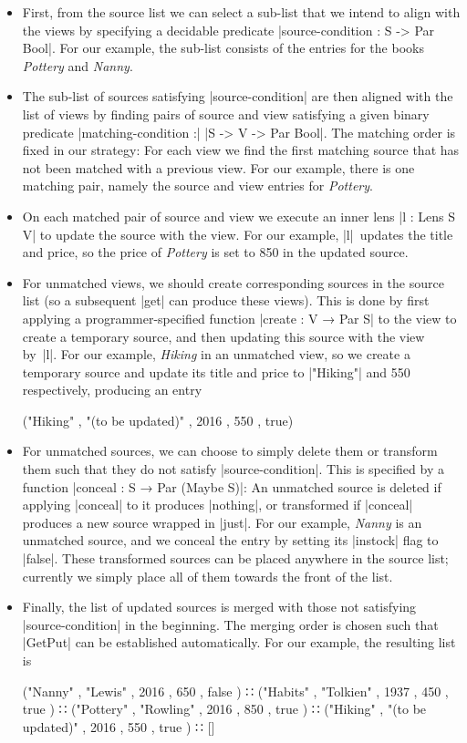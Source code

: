 \documentclass{sigplanconf}
\begin{document}
\begin{itemize}[leftmargin=*]
\item
First, from the source list we can select a sub-list that we intend to align with the views by specifying a decidable predicate 
|source-condition : S -> Par Bool|.
For our example, the sub-list consists of the entries for the books \textsl{Pottery} and \textsl{Nanny}.
\item
The sub-list of sources satisfying |source-condition| are then aligned with the list of views by finding pairs of source and view satisfying a given binary predicate |matching-condition :| |S -> V -> Par Bool|.
The matching order is fixed in our strategy: For each view we find the first matching source that has not been matched with a previous view.
For our example, there is one matching pair, namely the source and view entries for \textsl{Pottery}.
\item
On each matched pair of source and view we execute an inner lens |l : Lens S V| to update the source with the view.
For our example, |l|~updates the title and price, so the price of \textsl{Pottery} is set to 850 in the updated source.
\item
For unmatched views, we should create corresponding sources in the source list (so a subsequent |get| can produce these views).
This is done by first applying a programmer-specified function |create : V → Par S| to the view to create a temporary source, and then updating this source with the view by~|l|.
For our example, \textsl{Hiking} in an unmatched view, so we create a temporary source and update its title and price to |"Hiking"| and 550 respectively, producing an entry
\begin{code}
("Hiking" , "(to be updated)" , 2016 , 550 , true)
\end{code}
\item
For unmatched sources, we can choose to simply delete them or transform them such that they do not satisfy |source-condition|.
This is specified by a function |conceal : S → Par (Maybe S)|: An unmatched source is deleted if applying |conceal| to it produces |nothing|, or transformed if |conceal| produces a new source wrapped in |just|.
For our example, \textsl{Nanny} is an unmatched source, and we conceal the entry by setting its |instock| flag to |false|.
These transformed sources can be placed anywhere in the source list; currently we simply place all of them towards the front of the list.
\item
Finally, the list of updated sources is merged with those not satisfying |source-condition| in the beginning.
The merging order is chosen such that |GetPut| can be established automatically.
For our example, the resulting list is
\begin{code}
("Nanny"    , "Lewis"            , 2016  , 650  , false  ) ∷
("Habits"   , "Tolkien"          , 1937  , 450  , true   ) ∷
("Pottery"  , "Rowling"          , 2016  , 850  , true   ) ∷
("Hiking"   , "(to be updated)"  , 2016  , 550  , true   ) ∷ []
\end{code}
\end{itemize}
\end{document}
